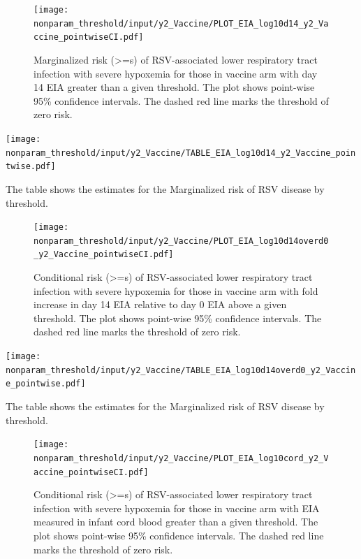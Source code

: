 \documentclass[11pt]{article}
\begin{document}
\begin{figure}[H]
    \centering
    \texttt{[image: nonparam\_threshold/input/y2\_Vaccine/PLOT\_EIA\_log10d14\_y2\_Vaccine\_pointwiseCI.pdf]}
   \caption{Marginalized risk (>=s) of RSV-associated lower respiratory tract infection with severe hypoxemia for those in vaccine arm with day 14 EIA greater than a given threshold. The plot shows point-wise 95\% confidence intervals. The dashed red line marks the threshold of zero risk.}

\end{figure}

\begin{table}[H]
    \centering
    \texttt{[image: nonparam\_threshold/input/y2\_Vaccine/TABLE\_EIA\_log10d14\_y2\_Vaccine\_pointwise.pdf]}
    \caption{The table shows the  estimates for the Marginalized risk of RSV disease by threshold. }
\end{table}

\begin{figure}[H]
    \centering
    \texttt{[image: nonparam\_threshold/input/y2\_Vaccine/PLOT\_EIA\_log10d14overd0\_y2\_Vaccine\_pointwiseCI.pdf]}
    \caption{Conditional risk (>=s) of RSV-associated lower respiratory tract infection with severe hypoxemia for those in vaccine arm with fold increase in day 14 EIA relative to day 0 EIA above a given threshold. The plot shows point-wise 95\% confidence intervals. The dashed red line marks the threshold of zero risk.}
       \label{fig:PLOT_EIA_log10d14overd0_y2_Vaccine_pointwiseCI}
\end{figure}

\begin{table}[H]
    \centering
    \texttt{[image: nonparam\_threshold/input/y2\_Vaccine/TABLE\_EIA\_log10d14overd0\_y2\_Vaccine\_pointwise.pdf]}
    \caption{The table shows the  estimates for the Marginalized risk of RSV disease by threshold. }
\end{table}

\begin{figure}[H]
    \centering
    \texttt{[image: nonparam\_threshold/input/y2\_Vaccine/PLOT\_EIA\_log10cord\_y2\_Vaccine\_pointwiseCI.pdf]}
   \caption{Conditional risk (>=s) of RSV-associated lower respiratory tract infection with severe hypoxemia for those in vaccine arm with EIA measured in infant cord blood greater than a given threshold. The plot shows point-wise 95\% confidence intervals. The dashed red line marks the threshold of zero risk.}
\end{figure}
\end{document}
